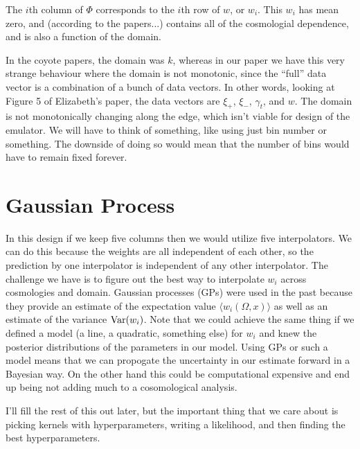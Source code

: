 \documentclass[11pt,twoside,a5paper]{article}
\begin{document}
The $i$th column of $\Phi$ corresponds to the $i$th row of $w$, or $w_i$. This $w_i$ has mean zero, and (according to the papers...) contains all of the cosmologial dependence, and is also a function of the domain. 

In the coyote papers, the domain was $k$, whereas in our paper we have this very strange behaviour where the domain is not monotonic, since the ``full'' data vector is a combination of a bunch of data vectors. In other words, looking at Figure 5 of Elizabeth's paper, the data vectors are $\xi_+$, $\xi_-$, $\gamma_t$, and $w$. The domain is not monotonically changing along the edge, which isn't viable for design of the emulator. We will have to think of something, like using just bin number or something. The downside of doing so would mean that the number of bins would have to remain fixed forever.

\section{Gaussian Process}
In this design if we keep five columns then we would utilize five interpolators. We can do this because the weights are all independent of each other, so the prediction by one interpolator is independent of any other interpolator. The challenge we have is to figure out the best way to interpolate $w_i$ across cosmologies and domain. Gaussian processes (GPs) were used in the past because they provide an estimate of the expectation value $\langle w_i(\Omega,x)\rangle$ as well as an estimate of the variance ${\rm Var}(w_i)$. Note that we could achieve the same thing if we defined a model (a line, a quadratic, something else) for $w_i$ and knew the posterior distributions of the parameters in our model. Using GPs or such a model means that we can propogate the uncertainty in our estimate forward in a Bayesian way. On the other hand this could be computational expensive and end up being not adding much to a cosomological analysis.

I'll fill the rest of this out later, but the important thing that we care about is picking kernels with hyperparameters, writing a likelihood, and then finding the best hyperparameters.
\end{document}
